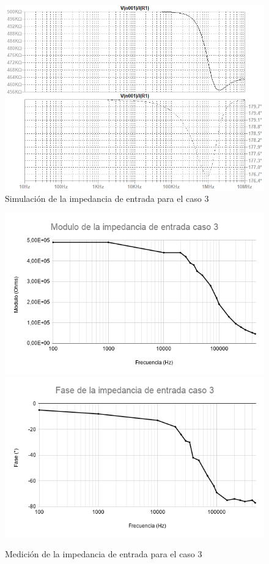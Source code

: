 \begin{figure}[H]
\begin{centering}
\includegraphics[scale=0.5]{../Ex1/iB/Resources1b/zinp3_sim}
\par\end{centering}
\caption{Simulación de la impedancia de entrada para el caso 3}
\end{figure}

\begin{figure}[H]
\begin{centering}
\includegraphics[scale=0.4]{../Ex1/iB/Resources1b/zinp3_m_med}\includegraphics[scale=0.4]{../Ex1/iB/Resources1b/zinp3_p_med}
\par\end{centering}
\caption{Medición de la impedancia de entrada para el caso 3}
\end{figure}

